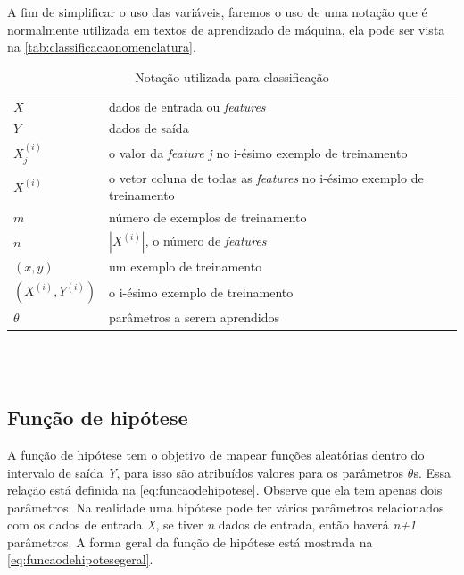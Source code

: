 A fim de simplificar o uso das variáveis, faremos o uso de uma notação que é normalmente utilizada em textos de aprendizado de máquina, ela pode ser vista na \autoref{tab:classificacaonomenclatura}.

\begin{table}[!htb]
\caption{Notação utilizada para classificação} \label{tab:classificacaonomenclatura}
\begin{center}
\begin{tabular}{ll}
  \toprule
  $X$ & dados de entrada ou \textit{features} \\
  $Y$ & dados de saída \\
  $X_j^{(i)}$ & o valor da \textit{feature} \textit{j} no i-ésimo exemplo de treinamento \\
  $X^{(i)}$ & o vetor coluna de todas as \textit{features} no i-ésimo exemplo de treinamento \\
  $m$ & número de exemplos de treinamento \\
  $n$ & $|X^{(i)}|$, o número de \textit{features} \\
  $(x, y)$ & um exemplo de treinamento \\
  $(X^{(i)}, Y^{(i)})$ & o i-ésimo exemplo de treinamento \\
  $\theta$ & parâmetros a serem aprendidos \\
  \bottomrule
\end{tabular}
\end{center}

\end{table}



\ \\
\ \\

\subsection{Função de hipótese}

A função de hipótese tem o objetivo de mapear funções aleatórias dentro do intervalo de saída \textit{Y}, para isso são atribuídos valores para os parâmetros $\theta$s. Essa relação está definida na \autoref{eq:funcaodehipotese}. Observe que ela tem apenas dois parâmetros. Na realidade uma hipótese pode ter vários parâmetros relacionados com os dados de entrada \textit{X}, se tiver \textit{n} dados de entrada, então haverá \textit{n+1} parâmetros. A forma geral da função de hipótese está mostrada na \autoref{eq:funcaodehipotesegeral}.

